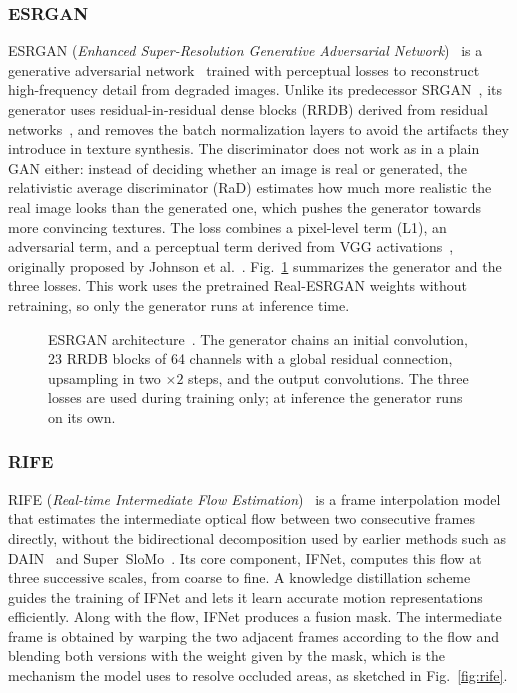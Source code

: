 \documentclass[conference]{IEEEtran}
\begin{document}
\subsubsection{ESRGAN}

ESRGAN (\textit{Enhanced Super-Resolution Generative Adversarial Network})~\cite{wang2018esrgan} is a generative adversarial network~\cite{goodfellow2014gan} trained with perceptual losses to reconstruct high-frequency detail from degraded images. Unlike its predecessor SRGAN~\cite{ledig2017srgan}, its generator uses residual-in-residual dense blocks (RRDB) derived from residual networks~\cite{he2016resnet}, and removes the batch normalization layers to avoid the artifacts they introduce in texture synthesis. The discriminator does not work as in a plain GAN either: instead of deciding whether an image is real or generated, the relativistic average discriminator (RaD) estimates how much more realistic the real image looks than the generated one, which pushes the generator towards more convincing textures. The loss combines a pixel-level term (L1), an adversarial term, and a perceptual term derived from VGG activations~\cite{simonyan2015vgg}, originally proposed by Johnson et al.~\cite{johnson2016perceptual}. Fig.~\ref{fig:esrgan} summarizes the generator and the three losses. This work uses the pretrained Real-ESRGAN weights without retraining, so only the generator runs at inference time.

\begin{figure}[t]
    \centering
    
    \caption{ESRGAN architecture~\cite{wang2018esrgan}. The generator chains an initial convolution, 23 RRDB blocks of 64 channels with a global residual connection, upsampling in two $\times2$ steps, and the output convolutions. The three losses are used during training only; at inference the generator runs on its own.}
    \label{fig:esrgan}
\end{figure}

\subsubsection{RIFE}

RIFE (\textit{Real-time Intermediate Flow Estimation})~\cite{huang2022rife} is a frame interpolation model that estimates the intermediate optical flow between two consecutive frames directly, without the bidirectional decomposition used by earlier methods such as DAIN~\cite{bao2019dain} and Super~SloMo~\cite{jiang2018superslomo}. Its core component, IFNet, computes this flow at three successive scales, from coarse to fine. A knowledge distillation scheme~\cite{hinton2015distilling} guides the training of IFNet and lets it learn accurate motion representations efficiently. Along with the flow, IFNet produces a fusion mask. The intermediate frame is obtained by warping the two adjacent frames according to the flow and blending both versions with the weight given by the mask, which is the mechanism the model uses to resolve occluded areas, as sketched in Fig.~\ref{fig:rife}.
\end{document}
